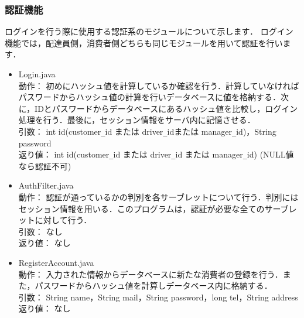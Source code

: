 \documentclass[a4j,titlepage]{jarticle}
\begin{document}
\subsubsection{認証機能}
ログインを行う際に使用する認証系のモジュールについて示します．
ログイン機能では，配達員側，消費者側どちらも同じモジュールを用いて認証を行います．
\begin{itemize}
\item Login.java\\
  動作： 初めにハッシュ値を計算しているか確認を行う．計算していなければパスワードからハッシュ値の計算を行いデータベースに値を格納する．次に，IDとパスワードからデータベースにあるハッシュ値を比較し，ログイン処理を行う．最後に，セッション情報をサーバ内に記憶させる．\\
  引数： int id(customer\verb|_|id または driver\verb|_|idまたは manager\verb|_|id)，String password\\
  返り値： int id(customer\verb|_|id または driver\verb|_|id または manager\verb|_|id) (NULL値なら認証不可)
\item AuthFilter.java\\
  動作： 認証が通っているかの判別を各サーブレットについて行う．判別にはセッション情報を用いる．このプログラムは，認証が必要な全てのサーブレットに対して行う．\\
  引数： なし\\
  返り値： なし
\item RegisterAccount.java\\
  動作： 入力された情報からデータベースに新たな消費者の登録を行う．また，パスワードからハッシュ値を計算しデータベース内に格納する．\\
  引数： String name，String mail，String password，long tel，String address\\
  返り値： なし
\end{itemize}
\end{document}

